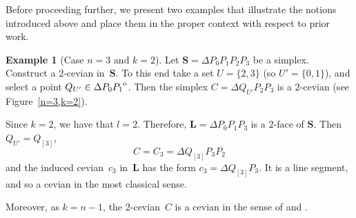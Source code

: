 \documentclass[12pt, reqno]{amsart}
\theoremstyle{definition}
\newtheorem{example}[theorem]{Example}
\theoremstyle{remark}
\numberwithin{equation}{section}
\newcommand{\interior}[1]{%
  {\kern0pt#1}^{\mathrm{o}}%
}
\begin{document}
{Before proceeding further, we present two examples that illustrate the notions introduced above and place them in the proper context with respect to prior work.
  
\begin{example}[Case $n=3\text{ and }k=2$]
Let $\mathbf{S} = \Delta P_0P_1P_2P_3$ be a simplex. Construct a $2$-cevian in~$\mathbf{S}$. To this end take a set $U=\{2,3\}$ (so $U'=\{0,1\}$), and select a point $Q_{U'}\in\interior{\Delta P_0P_1}$. Then the simplex $C = \Delta Q_{U'}P_2P_3$ is a $2\mbox{-cevian}$ (see Figure~\ref{n=3,k=2}).

Since $k=2$, we have that $l=2$. Therefore, $\mathbf{L}=\Delta P_0P_1P_3$ is a $2\mbox{-face}$ of $\mathbf{S}$. Then $Q_{U'}=Q_{[3]}$,
\[
C=C_3=\Delta Q_{[3]}P_3P_2
\]
and the induced cevian~$c_3$ in~$\mathbf{L}$ has the form $c_3=\Delta Q_{[3]}P_3$. It is a line segment, and so a cevian in the most classical sense.

Moreover, as $k=n-1$, the $2$-cevian~$C$ is a cevian in the sense of \cite{Witczynski} and \cite{Buba-Brzozowa}.
\end{example}

\begin{figure}  
\centering  
{} %
\end{figure}}
\end{document}
